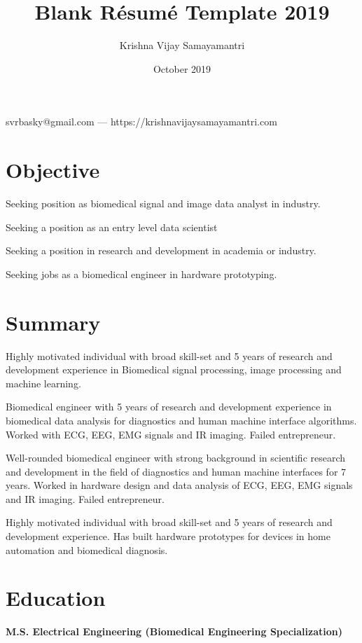 \documentclass{article}
\makeatletter
\renewcommand{\maketitle}{
\begin{center}
    {\huge\bfseries
    \theauthor}
    
    \vspace{.25em}
    
    svrbasky@gmail.com --- https://krishnavijaysamayamantri.com
    
\end{center}
}
\makeatother
\begin{document}
\title{Blank R\'esum\'e Template 2019}
\author{Krishna Vijay Samayamantri}
\date{October 2019}
\maketitle


\section{Objective}
Seeking position as biomedical signal and image data analyst in industry. 

\noindent Seeking a position as an entry level data scientist 

\noindent Seeking a position in research and development in academia or industry.

\noindent Seeking jobs as a biomedical engineer in hardware prototyping.

\section{Summary}
\noindent
Highly motivated individual with broad skill-set and 5 years of research and development experience in Biomedical signal processing, image processing and machine learning.

\noindent
Biomedical engineer with 5 years of research and development experience in biomedical data analysis for diagnostics and human machine interface algorithms. Worked with ECG, EEG, EMG signals and IR imaging. Failed entrepreneur.

\noindent
Well-rounded biomedical engineer with strong background in scientific research and development in the field of diagnostics and human machine interfaces for 7 years. Worked in hardware design and data analysis of ECG, EEG, EMG signals and IR imaging. Failed entrepreneur.

\noindent
Highly motivated individual with broad skill-set and 5 years of research and development experience. Has built hardware prototypes for devices in home automation and biomedical diagnosis.

\section{Education}
\textbf{M.S. Electrical Engineering (Biomedical Engineering Specialization)}
\end{document}
